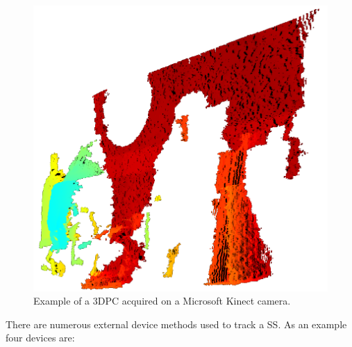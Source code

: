                 \begin{figure}
                    \centering
                    
                    \includegraphics[width=1.0\linewidth]{figures/background_3dpc_example.png}
                    
                    \captionsetup{singlelinecheck=false, justification=raggedright}
                    \caption{Example of a \gls{3DPC} acquired on a Microsoft Kinect camera.}
                    \label{fig:external_devices_3dpc_example}
                \end{figure}
                
                There are numerous external device methods used to track a \gls{SS}. As an example four devices are:
                
